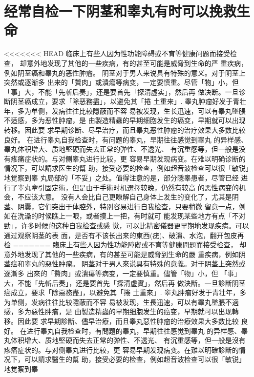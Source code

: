 \documentclass[12pt,UTF8]{ctexbook}
\begin{document}
\section{经常自检一下阴茎和睾丸有时可以挽救生命}

<<<<<<< HEAD
临床上有些人因为性功能障碍或不育等健康问题而接受检查，
却意外地发现了其他的一些疾病，有的甚至可能是威脅到生命的严
重疾病，例如阴茎癌和睾丸的恶性肿瘤。
阴茎对于男人来说具有特殊的意义。对于阴茎上突然或逐渐多
出来的「贅肉」或潰瘍等病变，一定要慎重。尽管「物」小，但
「事」大，不能「先斬后奏」，还是要首先「探清虚实」，然后再
做决断。一旦诊断阴茎癌成立，要求「除恶務盡」，以避免其「捲
土重来」.
睾丸肿瘤好发于青壮年，多为单侧，发病往往比较隱蔽而不容
易被发现，生长迅速，可以有睾丸墜脹不适感，多为恶性肿瘤，是
由製造精蟲的早期细胞发生的癌变，早期就可以出现转移。因此要
求早期诊断、尽早治疗，而且睾丸恶性肿瘤的治疗效果大多数比较
良好。
在进行睾丸自我检查时，有问题的睾丸，早期往往感觉到睾丸
的异样感、睾丸体积增大、质地堅硬而失去正常的弹性、不透光、
有沉重感等，但一般是没有疼痛症状的。与对侧睾丸进行比较，更
容易早期发现病变。在难以明确诊断的情况下，可以請求医生的幫
助，接受必要的检查，例如超音波检查可以很「敏锐」地觉察到睾
丸局部的「不妥」之处。值得注意的是，部分隱睾患者，尽管已经
进行了睾丸牽引固定術，但是由于手術时机選擇较晚，仍然有较高
的恶性病变的机会，不应该大意。
没有人会比自己更瞭解自己身体上发生的变化了，尤其是阴
茎、阴囊，它们突出于体腔外，特別容易进行自我检查，只要稍微
留意一点，例如在洗澡的时候瞧上一眼，或者摸上一把，有时就可
能发现某些地方有点「不对勁」，许多时候的这种自我检查或感
觉，可以比精密儀器更早期地发现疾病。可以通过观察阴茎的表
面，是否有不该长出来的東西(疣)、破潰、水泡，翻开包皮再检
=======
臨床上有些人因为性功能障礙或不育等健康問題而接受检查，
却意外地发现了其他的一些疾病，有的甚至可能是威脅到生命的嚴
重疾病，例如阴茎癌和睾丸的惡性肿瘤。
阴茎对于男人來说具有特殊的意義。对于阴茎上突然或逐漸多
出來的「贅肉」或潰瘍等病变，一定要慎重。儘管「物」小，但
「事」大，不能「先斬后奏」，还是要首先「探清虚實」，然后再
做決斷。一旦診斷阴茎癌成立，要求「除惡務盡」，以避免其「捲
土重來」.
睾丸肿瘤好发于青壮年，多为单侧，发病往往比较隱蔽而不容
易被发现，生長迅速，可以有睾丸墜脹不適感，多为惡性肿瘤，是
由製造精蟲的早期细胞发生的癌变，早期就可以出现轉移。因此要
求早期診斷、儘早治療，而且睾丸惡性肿瘤的治療效果大多数比较
良好。
在进行睾丸自我检查时，有問題的睾丸，早期往往感觉到睾丸
的异样感、睾丸体积增大、质地堅硬而失去正常的弹性、不透光、
有沉重感等，但一般是沒有疼痛症状的。与对侧睾丸进行比较，更
容易早期发现病变。在難以明確診斷的情况下，可以請求醫生的幫
助，接受必要的检查，例如超音波检查可以很「敏锐」地觉察到睾
\end{document}
